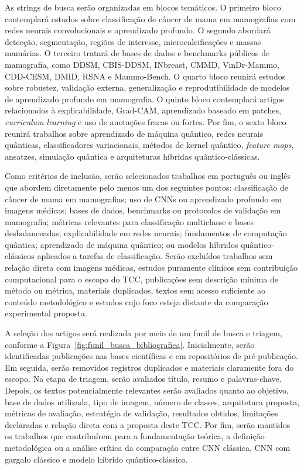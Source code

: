 \documentclass[
    12pt,
    openright,
    oneside,
    a4paper,
    english,
    brazil
]{abntex2}
\begin{document}
As strings de busca serão organizadas em blocos temáticos. O primeiro bloco contemplará estudos sobre classificação de câncer de mama em mamografias com redes neurais convolucionais e aprendizado profundo. O segundo abordará detecção, segmentação, regiões de interesse, microcalcificações e massas mamárias. O terceiro tratará de bases de dados e benchmarks públicos de mamografia, como DDSM, CBIS-DDSM, INbreast, CMMD, VinDr-Mammo, CDD-CESM, DMID, RSNA e Mammo-Bench. O quarto bloco reunirá estudos sobre robustez, validação externa, generalização e reprodutibilidade de modelos de aprendizado profundo em mamografia. O quinto bloco contemplará artigos relacionados à explicabilidade, Grad-CAM, aprendizado baseado em patches, \textit{curriculum learning} e uso de anotações fracas ou fortes. Por fim, o sexto bloco reunirá trabalhos sobre aprendizado de máquina quântico, redes neurais quânticas, classificadores variacionais, métodos de kernel quântico, \textit{feature maps}, ansatzes, simulação quântica e arquiteturas híbridas quântico-clássicas.

Como critérios de inclusão, serão selecionados trabalhos em português ou inglês que abordem diretamente pelo menos um dos seguintes pontos: classificação de câncer de mama em mamografias; uso de CNNs ou aprendizado profundo em imagens médicas; bases de dados, benchmarks ou protocolos de validação em mamografia; métricas relevantes para classificação multiclasse e bases desbalanceadas; explicabilidade em redes neurais; fundamentos de computação quântica; aprendizado de máquina quântico; ou modelos híbridos quântico-clássicos aplicados a tarefas de classificação. Serão excluídos trabalhos sem relação direta com imagens médicas, estudos puramente clínicos sem contribuição computacional para o escopo do TCC, publicações sem descrição mínima de método ou métrica, materiais duplicados, textos sem acesso suficiente ao conteúdo metodológico e estudos cujo foco esteja distante da comparação experimental proposta.

A seleção dos artigos será realizada por meio de um funil de busca e triagem, conforme a Figura~\ref{fig:funil_busca_bibliografica}. Inicialmente, serão identificadas publicações nas bases científicas e em repositórios de pré-publicação. Em seguida, serão removidos registros duplicados e materiais claramente fora do escopo. Na etapa de triagem, serão avaliados título, resumo e palavras-chave. Depois, os textos potencialmente relevantes serão avaliados quanto ao objetivo, base de dados utilizada, tipo de imagem, número de classes, arquitetura proposta, métricas de avaliação, estratégia de validação, resultados obtidos, limitações declaradas e relação direta com a proposta deste TCC. Por fim, serão mantidos os trabalhos que contribuírem para a fundamentação teórica, a definição metodológica ou a análise crítica da comparação entre CNN clássica, CNN com gargalo clássico e modelo híbrido quântico-clássico.
\end{document}
